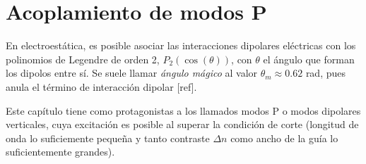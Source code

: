 \chapter{Acoplamiento de modos P}
En electroestática, es posible asociar las interacciones dipolares eléctricas con los polinomios de Legendre de orden 2, $P_2(\cos(\theta))$, con $\theta$ el ángulo que forman los dipolos entre sí. Se suele llamar \textit{ángulo mágico} al valor $\theta_m \approx 0.62$ rad, pues anula el término de interacción dipolar [ref]. 

Este capítulo tiene como protagonistas a los llamados modos P o modos dipolares verticales, cuya excitación es posible al superar la condición de corte (longitud de onda lo suficiemente pequeña y tanto contraste $\Delta n$ como ancho de la guía lo suficientemente grandes).



